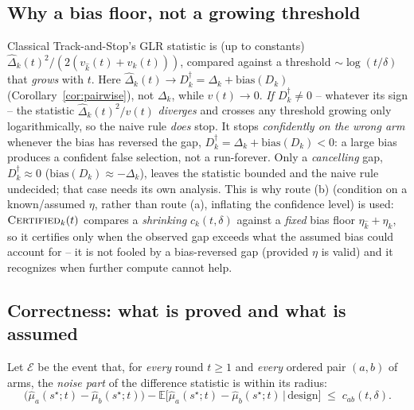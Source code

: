 \subsection{Why a bias floor, not a growing threshold}
\label{sec:theorem4-eta}

\begin{remark}
Classical Track-and-Stop's GLR statistic is (up to constants) $\widehat{\Delta}_k(t)^2 /
(2(v_{\hat{k}}(t)+v_k(t)))$, compared against a threshold $\sim \log(t/\delta)$ that
\emph{grows} with $t$. Here $\widehat\Delta_k(t) \to D_k^\dagger = \Delta_k +
\mathrm{bias}(D_k)$ (Corollary~\ref{cor:pairwise}), not $\Delta_k$, while $v(t) \to 0$.
\emph{If $D_k^\dagger \ne 0$} -- whatever its sign -- the statistic $\widehat\Delta_k(t)^2/v(t)$
\emph{diverges} and crosses any threshold growing only logarithmically, so the naive rule
\emph{does} stop. It stops \emph{confidently on the wrong arm} whenever the bias has
reversed the gap, $D_k^\dagger = \Delta_k + \mathrm{bias}(D_k) < 0$: a large bias produces a
confident false selection, not a run-forever. Only a \emph{cancelling} gap,
$D_k^\dagger \approx 0$ ($\mathrm{bias}(D_k) \approx -\Delta_k$), leaves the statistic bounded
and the naive rule undecided; that case needs its own analysis. This is why route (b)
(condition on a known/assumed $\eta$, rather than route (a), inflating the confidence level)
is used: $\textsc{Certified}_k(t)$ compares a \emph{shrinking} $c_k(t,\delta)$ against a
\emph{fixed} bias floor $\eta_{\hat{k}}+\eta_k$, so it certifies only when the observed gap
exceeds what the assumed bias could account for -- it is not fooled by a bias-reversed gap
(provided $\eta$ is valid) and it recognizes when further compute cannot help.
\end{remark}

\subsection{Correctness: what is proved and what is assumed}
\label{sec:theorem4-correctness}

\begin{definition}
\label{def:sc}
Let $\mathcal{E}$ be the event that, for \emph{every} round $t \ge 1$ and \emph{every} ordered
pair $(a,b)$ of arms, the \emph{noise part} of the difference statistic is within its radius:
\[
  \Big( \hat\mu_a(s^\star;t) - \hat\mu_b(s^\star;t)\Big)
  - \mathbb{E}\big[\hat\mu_a(s^\star;t) - \hat\mu_b(s^\star;t) \,\big|\, \text{design}\big]
  \;\le\; c_{ab}(t,\delta).
\]
\end{definition}

